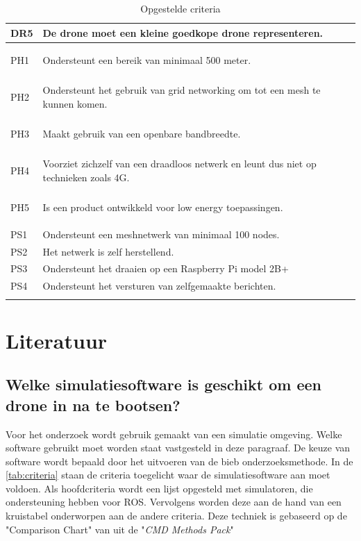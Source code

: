 \documentclass[a4paper, 11pt, oneside]{report}
\begin{document}
\begin{longtable}{|l|l|l|}
		DR5		& De drone moet een kleine goedkope drone representeren.        \\ \hline
		\hypertarget{ph1}{PH1}		& Ondersteunt een bereik van minimaal 500 meter.  \\ \hline
		\hypertarget{ph2}{PH2}		& Ondersteunt het gebruik van grid networking om tot een mesh te kunnen komen.  \\ \hline
		\hypertarget{ph3}{PH3}		& Maakt gebruik van een openbare bandbreedte.\\ \hline
		\hypertarget{ph4}{PH4}		& Voorziet zichzelf van een draadloos netwerk en leunt dus niet op technieken zoals 4G.\\ \hline
		\hypertarget{ph5}{PH5}		& Is een product ontwikkeld voor low energy toepassingen. \\ \hline
		PS1		& Ondersteunt een meshnetwerk van minimaal 100 nodes. \\ \hline
		PS2		& Het netwerk is zelf herstellend. \\ \hline
		PS3		& Ondersteunt het draaien op een Raspberry Pi model 2B+ \\ \hline
		PS4		& Ondersteunt het versturen van zelfgemaakte berichten. \\ \hline
		
	\caption{Opgestelde criteria}
	\label{tab:criteria}
\end{longtable}

\chapter{Literatuur}


\section[Welke simulatiesoftware?]{Welke simulatiesoftware is geschikt om een drone in na te bootsen?}
\label{sec:welkesim}
Voor het onderzoek wordt gebruik gemaakt van een simulatie omgeving.
Welke software gebruikt moet worden staat vastgesteld in deze paragraaf.
De keuze van software wordt bepaald door het uitvoeren van de bieb onderzoeksmethode. 
In de \autoref{tab:criteria} staan de criteria toegelicht waar de simulatiesoftware aan moet voldoen.
Als hoofdcriteria wordt een lijst opgesteld met simulatoren, die ondersteuning hebben voor ROS.
Vervolgens worden deze aan de hand van een kruistabel onderworpen aan de andere criteria.
Deze techniek is gebaseerd op de "Comparison Chart" van \cite{CMDmethod} uit de "\textit{CMD Methods Pack}"
\end{document}
